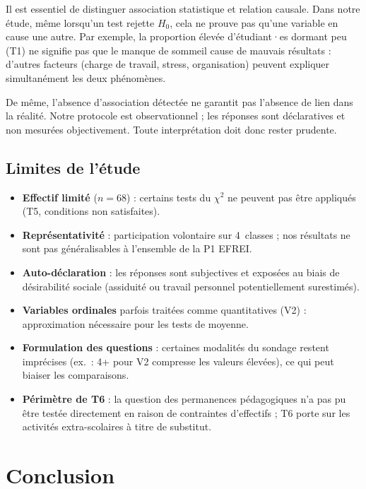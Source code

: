 Il est essentiel de distinguer association statistique et relation causale.
Dans notre étude, même lorsqu'un test rejette $H_0$, cela ne prouve pas qu'une
variable en cause une autre. Par exemple, la proportion élevée d'étudiant·es
dormant peu (T1) ne signifie pas que le manque de sommeil cause de mauvais
résultats : d'autres facteurs (charge de travail, stress, organisation) peuvent
expliquer simultanément les deux phénomènes.

De même, l'absence d'association détectée ne garantit pas l'absence de lien
dans la réalité. Notre protocole est observationnel ; les réponses sont
déclaratives et non mesurées objectivement. Toute interprétation doit donc
rester prudente.

\subsection{Limites de l'étude}

\begin{itemize}
  \item \textbf{Effectif limité} ($n = 68$) : certains tests du $\chi^2$ ne
        peuvent pas être appliqués (T5, conditions non satisfaites).
  \item \textbf{Représentativité} : participation volontaire sur 4~classes ;
        nos résultats ne sont pas généralisables à l'ensemble de la P1 EFREI.
  \item \textbf{Auto-déclaration} : les réponses sont subjectives et exposées
        au biais de désirabilité sociale (assiduité ou travail personnel
        potentiellement surestimés).
  \item \textbf{Variables ordinales} parfois traitées comme quantitatives
        (V2) : approximation nécessaire pour les tests de moyenne.
  \item \textbf{Formulation des questions} : certaines modalités du sondage
        restent imprécises (ex.\ : \og{}4+\fg{} pour V2 compresse les valeurs
        élevées), ce qui peut biaiser les comparaisons.
  \item \textbf{Périmètre de T6} : la question des permanences pédagogiques
        n'a pas pu être testée directement en raison de contraintes d'effectifs ;
        T6 porte sur les activités extra-scolaires à titre de substitut.
\end{itemize}

\section*{Conclusion}


